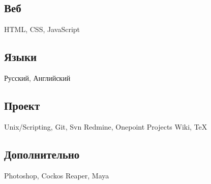 \documentclass[a4paper]{curricula-vitae}
\begin{document}
\begin{minipage}[t]{0.33\textwidth}
\subsection{Веб}
HTML, CSS, JavaScript

\subsection{Языки}
Русский, Английский

\subsection{Проект}
Unix/Scripting, Git, Svn
Redmine, Onepoint Projects
Wiki, TeX

\subsection{Дополнительно}
Photoshop, 
Cockos Reaper, 
Maya

\end{minipage} %
\hfill
\end{document}

